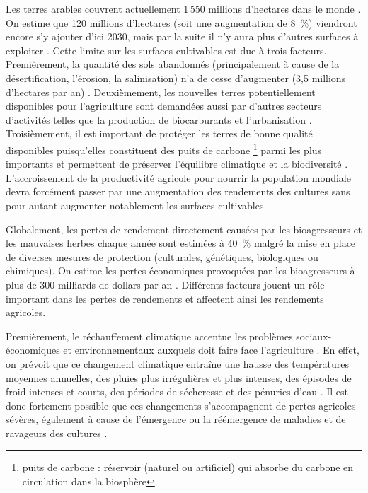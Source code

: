 	Les terres arables couvrent actuellement 1\,550 millions d’hectares dans le
monde \citep{FAO2017}. On estime que  120 millions d’hectares (soit une augmentation de 8~\%) viendront
encore s’y ajouter d’ici 2030, mais par la suite il n'y aura plus d'autres surfaces à exploiter \citep{Movahedi2009}. Cette limite sur les surfaces cultivables est due à trois facteurs. Premièrement, la quantité des sols abandonnés (principalement à cause de la désertification, l'érosion, la salinisation)  n'a de cesse d'augmenter (3,5 millions d’hectares par an) \citep{Movahedi2009}. Deuxièmement, les nouvelles terres potentiellement disponibles  pour l'agriculture sont demandées aussi par  d'autres secteurs d'activités telles que la production de biocarburants et l'urbanisation \citep{Movahedi2009, Tscharntke2012}. Troisièmement, il est important de protéger les terres de bonne qualité  disponibles puisqu'elles constituent des puits de carbone \footnote{puits de carbone : réservoir (naturel ou artificiel) qui absorbe du carbone en circulation dans la biosphère}  parmi les plus importants  et permettent de préserver  l’équilibre climatique et la biodiversité  \citep{Godfray2010}.  
L'accroissement de la productivité agricole pour nourrir la population mondiale devra forcément passer par une augmentation des rendements des cultures sans pour autant augmenter notablement les surfaces cultivables.

	Globalement, les pertes de rendement directement causées par les bioagresseurs  et les mauvaises herbes chaque année sont estimées à 40~\%  \citep{Agrios2005, Madden1995, Oerke1994} malgré la mise en place de diverses mesures de protection (culturales, génétiques, biologiques ou chimiques). On estime  les pertes économiques provoquées par les bioagresseurs à plus de 300 milliards de dollars par an \citep{Oerke1994}. Différents  facteurs  jouent  un rôle important dans les pertes de rendements et  affectent ainsi les rendements agricoles.
	 
Premièrement, le réchauffement climatique accentue les problèmes sociaux-économi\-ques et environnementaux auxquels doit faire face  l'agriculture  \citep{Fischer2005}. En effet, 
on prévoit que ce changement climatique entraîne une hausse des températures moyennes annuelles, des pluies plus irrégulières et plus intenses, des épisodes de froid intenses et courts, des périodes de sécheresse et des  pénuries d'eau \citep*{EEA2016}. Il est donc fortement possible que ces changements s'accompagnent de pertes agricoles sévères,  également à cause  de  l'émergence ou la réémergence de maladies et de ravageurs des cultures \citep{Garrett2011, Anderson2004, Palumbi2001}.%

